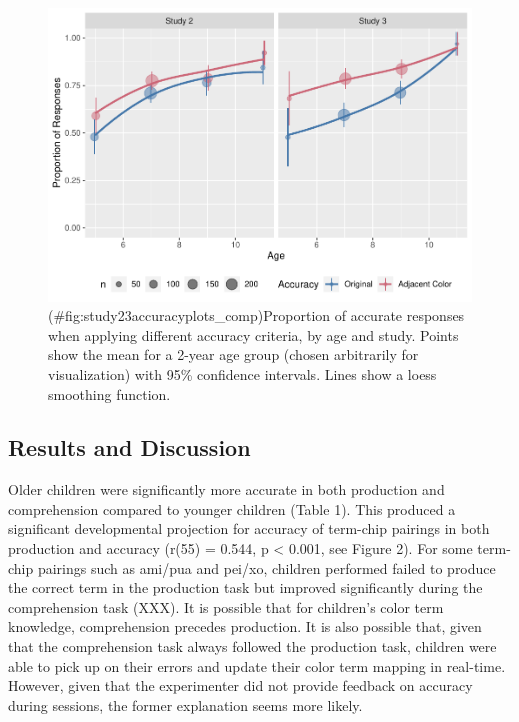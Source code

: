 \documentclass[
  english,
  ,man,floatsintext]{apa6}
\begin{document}
\begin{figure}
\centering
\includegraphics{amazon_color_files/figure-latex/study23accuracyplots_comp-1.pdf}
\caption{(\#fig:study23accuracyplots\_comp)Proportion of accurate responses when applying different accuracy criteria, by age and study. Points show the mean for a 2-year age group (chosen arbitrarily for visualization) with 95\% confidence intervals. Lines show a loess smoothing function.}
\end{figure}

\hypertarget{results-and-discussion-1}{%
\subsection{Results and Discussion}\label{results-and-discussion-1}}

Older children were significantly more accurate in both production and comprehension compared to younger children (Table 1). This produced a significant developmental projection for accuracy of term-chip pairings in both production and accuracy (r(55) = 0.544, p \textless{} 0.001, see Figure 2). For some term-chip pairings such as ami/pua and pei/xo, children performed failed to produce the correct term in the production task but improved significantly during the comprehension task (XXX). It is possible that for children's color term knowledge, comprehension precedes production. It is also possible that, given that the comprehension task always followed the production task, children were able to pick up on their errors and update their color term mapping in real-time. However, given that the experimenter did not provide feedback on accuracy during sessions, the former explanation seems more likely.
\end{document}
